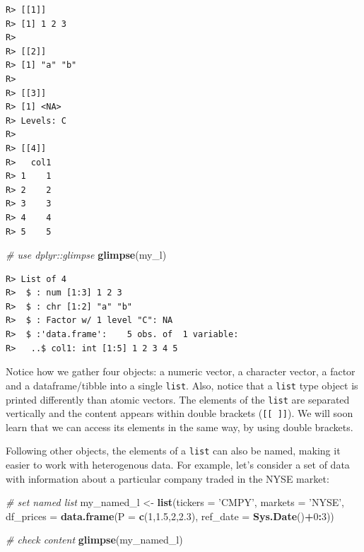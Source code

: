 \documentclass[
  12pt,
]{book}
\newenvironment{Shaded}{\begin{snugshade}}{\end{snugshade}}
\newcommand{\CommentTok}[1]{\textcolor[rgb]{0.37,0.37,0.37}{\textit{#1}}}
\newcommand{\DataTypeTok}[1]{\textcolor[rgb]{0.27,0.27,0.27}{#1}}
\newcommand{\DecValTok}[1]{\textcolor[rgb]{0.06,0.06,0.06}{#1}}
\newcommand{\FloatTok}[1]{\textcolor[rgb]{0.06,0.06,0.06}{#1}}
\newcommand{\KeywordTok}[1]{\textcolor[rgb]{0.27,0.27,0.27}{\textbf{#1}}}
\newcommand{\NormalTok}[1]{#1}
\newcommand{\OperatorTok}[1]{\textcolor[rgb]{0.43,0.43,0.43}{\textbf{#1}}}
\newcommand{\StringTok}[1]{\textcolor[rgb]{0.5,0.5,0.5}{#1}}
\begin{document}
\begin{verbatim}
R> [[1]]
R> [1] 1 2 3
R> 
R> [[2]]
R> [1] "a" "b"
R> 
R> [[3]]
R> [1] <NA>
R> Levels: C
R> 
R> [[4]]
R>   col1
R> 1    1
R> 2    2
R> 3    3
R> 4    4
R> 5    5
\end{verbatim}

\begin{Shaded}
\begin{Highlighting}[]
\CommentTok{# use dplyr::glimpse}
\KeywordTok{glimpse}\NormalTok{(my_l)}
\end{Highlighting}
\end{Shaded}

\begin{verbatim}
R> List of 4
R>  $ : num [1:3] 1 2 3
R>  $ : chr [1:2] "a" "b"
R>  $ : Factor w/ 1 level "C": NA
R>  $ :'data.frame':    5 obs. of  1 variable:
R>   ..$ col1: int [1:5] 1 2 3 4 5
\end{verbatim}

Notice how we gather four objects: a numeric vector, a character vector, a factor and a dataframe/tibble into a single \texttt{list}. Also, notice that a \texttt{list} type object is printed differently than atomic vectors. The elements of the \texttt{list} are separated vertically and the content appears within double brackets (\texttt{{[}{[}\ {]}{]}}). We will soon learn that we can access its elements in the same way, by using double brackets.

Following other objects, the elements of a \texttt{list} can also be named, making it easier to work with heterogenous data. For example, let's consider a set of data with information about a particular company traded in the NYSE market:

\begin{Shaded}
\begin{Highlighting}[]
\CommentTok{# set named list}
\NormalTok{my_named_l <-}\StringTok{ }\KeywordTok{list}\NormalTok{(}\DataTypeTok{tickers =} \StringTok{'CMPY'}\NormalTok{,}
                   \DataTypeTok{markets =} \StringTok{'NYSE'}\NormalTok{,}
                   \DataTypeTok{df_prices =} \KeywordTok{data.frame}\NormalTok{(}\DataTypeTok{P =} \KeywordTok{c}\NormalTok{(}\DecValTok{1}\NormalTok{,}\FloatTok{1.5}\NormalTok{,}\DecValTok{2}\NormalTok{,}\FloatTok{2.3}\NormalTok{),}
                                          \DataTypeTok{ref_date =} \KeywordTok{Sys.Date}\NormalTok{()}\OperatorTok{+}\DecValTok{0}\OperatorTok{:}\DecValTok{3}\NormalTok{))}

\CommentTok{# check content}
\KeywordTok{glimpse}\NormalTok{(my_named_l)}
\end{Highlighting}
\end{Shaded}
\end{document}
